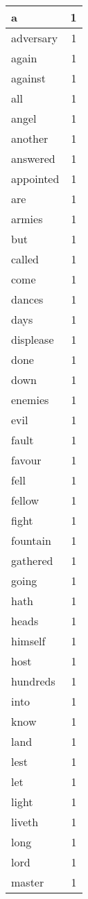 \begin{center}
\begin{longtable}{l|r}
a & 1 \\ \hline
adversary & 1 \\ \hline
again & 1 \\ \hline
against & 1 \\ \hline
all & 1 \\ \hline
angel & 1 \\ \hline
another & 1 \\ \hline
answered & 1 \\ \hline
appointed & 1 \\ \hline
are & 1 \\ \hline
armies & 1 \\ \hline
but & 1 \\ \hline
called & 1 \\ \hline
come & 1 \\ \hline
dances & 1 \\ \hline
days & 1 \\ \hline
displease & 1 \\ \hline
done & 1 \\ \hline
down & 1 \\ \hline
enemies & 1 \\ \hline
evil & 1 \\ \hline
fault & 1 \\ \hline
favour & 1 \\ \hline
fell & 1 \\ \hline
fellow & 1 \\ \hline
fight & 1 \\ \hline
fountain & 1 \\ \hline
gathered & 1 \\ \hline
going & 1 \\ \hline
hath & 1 \\ \hline
heads & 1 \\ \hline
himself & 1 \\ \hline
host & 1 \\ \hline
hundreds & 1 \\ \hline
into & 1 \\ \hline
know & 1 \\ \hline
land & 1 \\ \hline
lest & 1 \\ \hline
let & 1 \\ \hline
light & 1 \\ \hline
liveth & 1 \\ \hline
long & 1 \\ \hline
lord & 1 \\ \hline
master & 1 \\ \hline

\end{longtable}
\end{center}
